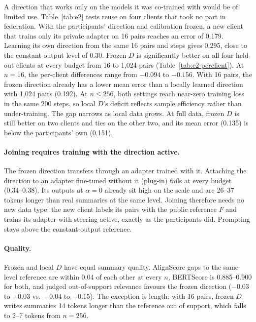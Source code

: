 \documentclass[11pt]{article}
\begin{document}
A direction that works only on the models it was co-trained with would be of limited use.
Table~\ref{tab:e2} tests reuse on four clients that took no part in federation.
With the participants' direction and calibration frozen, a new client that trains only its private adapter on 16 pairs reaches an error of 0.179.
Learning its own direction from the same 16 pairs and steps gives 0.295, close to the constant-output level of 0.30.
Frozen $D$ is significantly better on all four held-out clients at every budget from 16 to 1{,}024 pairs (Table~\ref{tab:e2-perclient}).
At $n=16$, the per-client differences range from $-0.094$ to $-0.156$.
With 16 pairs, the frozen direction already has a lower mean error than a locally learned direction with 1{,}024 pairs (0.192).
At $n\le256$, both settings reach near-zero training loss in the same 200 steps, so local $D$'s deficit reflects sample efficiency rather than under-training.
The gap narrows as local data grows.
At full data, frozen $D$ is still better on two clients and ties on the other two, and its mean error (0.135) is below the participants' own (0.151).

\paragraph{Joining requires training with the direction active.}
The frozen direction transfers through an adapter trained with it.
Attaching the direction to an adapter fine-tuned without it (plug-in) fails at every budget (0.34--0.38).
Its outputs at $\alpha=0$ already sit high on the scale and are 26--37 tokens longer than real summaries at the same level.
Joining therefore needs no new data type: the new client labels its pairs with the public reference $F$ and trains its adapter with steering active, exactly as the participants did.
Prompting stays above the constant-output reference.

\paragraph{Quality.}
Frozen and local $D$ have equal summary quality.
AlignScore gaps to the same-level reference are within 0.04 of each other at every $n$, BERTScore is 0.885--0.900 for both, and judged out-of-support relevance favours the frozen direction ($-0.03$ to $+0.03$ vs.\ $-0.04$ to $-0.15$).
The exception is length: with 16 pairs, frozen $D$ writes summaries 14 tokens longer than the reference out of support, which falls to 2--7 tokens from $n=256$.
\end{document}
